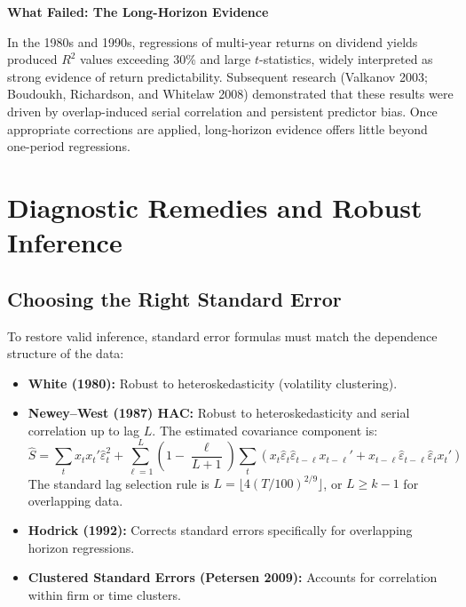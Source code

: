 \begin{callout}
\noindent \textbf{What Failed: The Long-Horizon Evidence}

In the 1980s and 1990s, regressions of multi-year returns on dividend yields produced $R^2$ values exceeding 30\% and large $t$-statistics, widely interpreted as strong evidence of return predictability. Subsequent research (Valkanov 2003; Boudoukh, Richardson, and Whitelaw 2008) demonstrated that these results were driven by overlap-induced serial correlation and persistent predictor bias. Once appropriate corrections are applied, long-horizon evidence offers little beyond one-period regressions.
\end{callout}

\section{Diagnostic Remedies and Robust Inference}
\label{sec:03-se}

\subsection{Choosing the Right Standard Error}
To restore valid inference, standard error formulas must match the dependence structure of the data:
\begin{itemize}
  \item \textbf{White (1980):} Robust to heteroskedasticity (volatility clustering).
  \item \textbf{Newey--West (1987) HAC:} Robust to heteroskedasticity and serial correlation up to lag $L$. The estimated covariance component is:
  \begin{equation}
    \hat S = \sum_t x_t x_t' \hat\varepsilon_t^2 + \sum_{\ell=1}^{L} \left(1 - \frac{\ell}{L+1}\right) \sum_t \left(x_t \hat\varepsilon_t \hat\varepsilon_{t-\ell} x_{t-\ell}' + x_{t-\ell} \hat\varepsilon_{t-\ell} \hat\varepsilon_t x_t'\right)
    \label{eq:03-nw}
  \end{equation}
  The standard lag selection rule is $L = \lfloor 4(T/100)^{2/9} \rfloor$, or $L \ge k-1$ for overlapping data.
  \item \textbf{Hodrick (1992):} Corrects standard errors specifically for overlapping horizon regressions.
  \item \textbf{Clustered Standard Errors (Petersen 2009):} Accounts for correlation within firm or time clusters.
\end{itemize}

